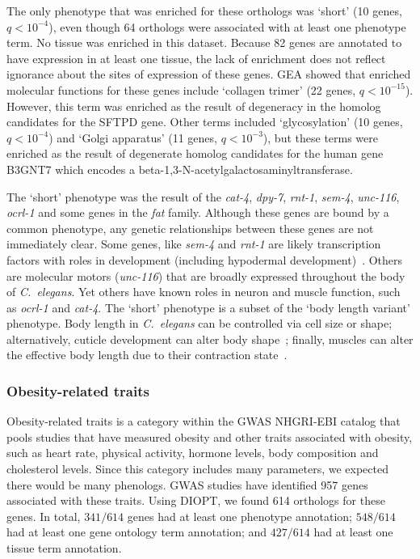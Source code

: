\documentclass[10pt, onecolumn]{article}
\newcommand{\cel}{\emph{C.~elegans}}
\newcommand{\hobesity}{957}
\newcommand{\wobesity}{614}
\newcommand{\qval}[1]{\ensuremath{q<10^{-#1}}}
\begin{document}
The only phenotype that was enriched for these orthologs was `short' (10 genes,
\qval{4}), even though 64 orthologs were associated with at least one phenotype
term. No tissue was enriched in this dataset. Because 82 genes are annotated to
have expression in at least one tissue, the lack of enrichment does not reflect
ignorance about the sites of expression of these genes. GEA showed that enriched
molecular functions for these genes include `collagen trimer' (22 genes,
\qval{15}). However, this term was enriched as the result of degeneracy in the
homolog candidates for the SFTPD gene. Other terms included `glycosylation' (10
genes, \qval{4}) and `Golgi apparatus' (11 genes, \qval{3}), but these terms
were enriched as the result of degenerate homolog candidates for the human gene
B3GNT7 which encodes a beta-1,3-N-acetylgalactosaminyltransferase.

The `short' phenotype was the result of the \emph{cat-4}, \emph{dpy-7},
\emph{rnt-1}, \emph{sem-4}, \emph{unc-116}, \emph{ocrl-1} and some genes in the
\emph{fat} family. Although these genes are bound by a common phenotype, any
genetic relationships between these genes are not immediately clear. Some genes,
like \emph{sem-4} and \emph{rnt-1} are likely transcription factors with roles
in development (including hypodermal development)~\cite{Desai1988,Ji2004}.
Others are molecular motors (\emph{unc-116}) that are broadly expressed
throughout the body of \cel{}. Yet others have known roles in neuron and muscle
function, such as \emph{ocrl-1} and \emph{cat-4}. The `short' phenotype is a
subset of the `body length variant' phenotype. Body length in \cel{} can be
controlled via cell size or shape\cite{Wang2002,Nakano2004}; alternatively,
cuticle development can alter body shape~\cite{Cox1980,Kramer1988}; finally,
muscles can alter the effective body length due to their contraction
state~\cite{Lewis1980}.


\subsubsection*{Obesity-related traits}
Obesity-related traits is a category within the GWAS NHGRI-EBI catalog that
pools studies that have measured obesity and other traits associated with
obesity, such as heart rate, physical activity, hormone levels, body composition
and cholesterol levels. Since this category includes many parameters, we
expected there would be many phenologs. GWAS studies have identified \hobesity{}
genes associated with these traits. Using DIOPT, we found \wobesity{} orthologs
for these genes. In total, $341/\wobesity{}$ genes had at least one phenotype
annotation; $548/\wobesity{}$ had at least one gene ontology term annotation;
and $427/\wobesity{}$ had at least one tissue term annotation.
\end{document}
